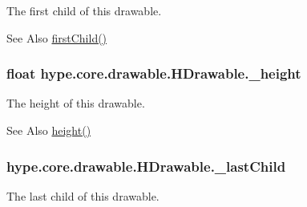 The first child of this drawable. 

\begin{DoxySeeAlso}{See Also}
\hyperlink{classhype_1_1core_1_1drawable_1_1_h_drawable_a30494a50fd2a78b74994c93bef961d8c}{first\-Child()} 
\end{DoxySeeAlso}
\hypertarget{classhype_1_1core_1_1drawable_1_1_h_drawable_ac4171079b3f6831d4f982ad2ae6363ce}{
\subsubsection[{\-\_\-height}]{\setlength{\rightskip}{0pt plus 5cm}float hype.\-core.\-drawable.\-H\-Drawable.\-\_\-height\hspace{0.3cm}{\ttfamily [protected]}}}\label{classhype_1_1core_1_1drawable_1_1_h_drawable_ac4171079b3f6831d4f982ad2ae6363ce}


The height of this drawable. 

\begin{DoxySeeAlso}{See Also}
\hyperlink{classhype_1_1core_1_1drawable_1_1_h_drawable_a60c5ca2c8e2fc75fda7221cf4f74010b}{height()} 
\end{DoxySeeAlso}
\hypertarget{classhype_1_1core_1_1drawable_1_1_h_drawable_aefc226e22c24a1a73e55d8a793e802f9}{
\subsubsection[{\-\_\-last\-Child}]{ hype.\-core.\-drawable.\-H\-Drawable.\-\_\-last\-Child\hspace{0.3cm}{\ttfamily [protected]}}}\label{classhype_1_1core_1_1drawable_1_1_h_drawable_aefc226e22c24a1a73e55d8a793e802f9}


The last child of this drawable. 

